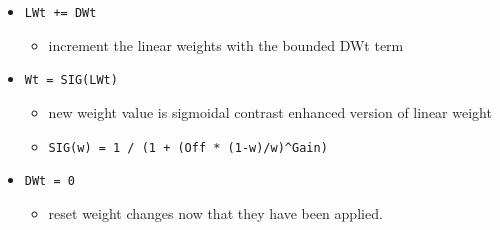 \documentclass[11pt,twoside]{article}
\newif\myifpdf
\providecommand{\tightlist}{%
  \setlength{\itemsep}{.25in}\setlength{\parskip}{-.25in}}
\begin{document}
\begin{itemize}
  \item \texttt{LWt\ +=\ DWt}

    \begin{itemize}
	\tightlist
    \item
      increment the linear weights with the bounded DWt term
    \end{itemize}
	
  \item\texttt{Wt\ =\ SIG(LWt)}

    \begin{itemize}
	\tightlist
    \item
      new weight value is sigmoidal contrast enhanced version of linear
      weight
    \item
      \texttt{SIG(w)\ =\ 1\ /\ (1\ +\ (Off\ *\ (1-w)/w)\^{}Gain)}
    \end{itemize}
	
  \item \texttt{DWt\ =\ 0}

    \begin{itemize}
	\tightlist
    \item
      reset weight changes now that they have been applied.
    \end{itemize}
\end{itemize}

% 

\end{document}
